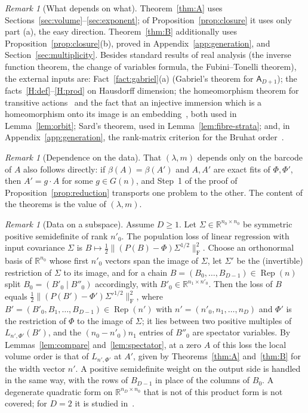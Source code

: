 \documentclass[11pt,a4paper]{article}
\theoremstyle{definition}
\theoremstyle{remark}
\newtheorem{remark}[theorem]{Remark}
\numberwithin{equation}{section}
\newcommand{\R}{\mathbb{R}}
\newcommand{\Rep}{\operatorname{Rep}}
\newcommand{\Fr}[1]{\lVert #1\rVert_{\mathrm F}}
\begin{document}
\begin{remark}[What depends on what]\label{rem:dependencies}
Theorem~\ref{thm:A} uses Sections~\ref{sec:volume}--\ref{sec:exponent}; of Proposition~\ref{prop:closure} it uses only part (a), the easy direction. Theorem~\ref{thm:B} additionally uses Proposition~\ref{prop:closure}(b), proved in Appendix~\ref{app:generation}, and Section~\ref{sec:multiplicity}. Besides standard results of real analysis (the inverse function theorem, the change of variables formula, the Fubini--Tonelli theorem), the external inputs are: Fact~\ref{fact:gabriel}(a) (Gabriel's theorem for $\mathsf A_{D+1}$); the facts~\ref{H:def}--\ref{H:prod} on Hausdorff dimension; the homeomorphism theorem for transitive actions~\cite{helgason} and the fact that an injective immersion which is a homeomorphism onto its image is an embedding~\cite{lee}, both used in Lemma~\ref{lem:orbit}; Sard's theorem, used in Lemma~\ref{lem:fibre-strata}; and, in Appendix~\ref{app:generation}, the rank-matrix criterion for the Bruhat order~\cite{bjorner-brenti}.
\end{remark}

\begin{remark}[Dependence on the data]\label{rem:invariance}
That $(\lambda,m)$ depends only on the barcode of $A$ also follows directly: if $\beta(A)=\beta(A')$ and $A,A'$ are exact fits of $\Phi,\Phi'$, then $A'=g\cdot A$ for some $g\in G(n)$, and Step~1 of the proof of Proposition~\ref{prop:reduction} transports one problem to the other. The content of the theorems is the value of $(\lambda,m)$.
\end{remark}

\begin{remark}[Data on a subspace]\label{rem:covariance}
Assume $D\ge1$. Let $\Sigma\in\R^{n_0\times n_0}$ be symmetric positive semidefinite of rank $n'_0$. The population loss of linear regression with input covariance $\Sigma$ is $B\mapsto\frac12\Fr{(P(B)-\Phi)\Sigma^{1/2}}^2$. Choose an orthonormal basis of $\R^{n_0}$ whose first $n'_0$ vectors span the image of $\Sigma$, let $\Sigma'$ be the (invertible) restriction of $\Sigma$ to its image, and for a chain $B=(B_0,\dots,B_{D-1})\in\Rep(n)$ split $B_0=(B'_0\mid B''_0)$ accordingly, with $B'_0\in\R^{n_1\times n'_0}$. Then the loss of $B$ equals $\frac12\Fr{(P(B')-\Phi')\Sigma'^{1/2}}^2$, where $B'=(B'_0,B_1,\dots,B_{D-1})\in\Rep(n')$ with $n'=(n'_0,n_1,\dots,n_D)$ and $\Phi'$ is the restriction of $\Phi$ to the image of $\Sigma$; it lies between two positive multiples of $L_{n',\Phi'}(B')$, and the $(n_0-n'_0)n_1$ entries of $B''_0$ are spectator variables. By Lemmas~\ref{lem:compare} and~\ref{lem:spectator}, at a zero $A$ of this loss the local volume order is that of $L_{n',\Phi'}$ at $A'$, given by Theorems~\ref{thm:A} and~\ref{thm:B} for the width vector $n'$. A positive semidefinite weight on the output side is handled in the same way, with the rows of $B_{D-1}$ in place of the columns of $B_0$. A degenerate quadratic form on $\R^{n_D\times n_0}$ that is not of this product form is not covered; for $D=2$ it is studied in~\cite{ferry-monod-yano}.
\end{remark}
\end{document}
